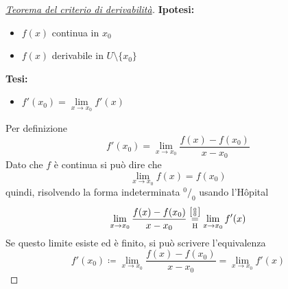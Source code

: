 \begin{proof}
  [\protect\hyperlink{teor:deriv}{Teorema del criterio di derivabilità}]
  \textbf{Ipotesi:}
  \begin{itemize}
    \item $f(x)$ continua in $x_0$
    \item $f(x)$ derivabile in $U\setminus\{x_0\}$
  \end{itemize}
  \textbf{Tesi:}
  \begin{itemize}
    \item $f'(x_0)=\lim\limits_{x\to x_0} f'(x)$
  \end{itemize}
  \divisor

  Per definizione
  \begin{equation*}
    f'(x_0) = \lim\limits_{x\to x_0} \frac{f(x)-f(x_0)}{x-x_0}
  \end{equation*}
  Dato che $f$ è continua si può dire che
  \begin{equation*}
    \lim\limits_{x\to x_0} f(x) = f(x_0)
  \end{equation*}
  quindi, risolvendo la forma indeterminata $^0\!/_0$ usando l'Hôpital
  \begin{equation*}
    \lim\limits_{x\to x_0} \frac{f(x)-f(x_0)}{x-x_0}\overset{\left[\frac{0}{0}\right]}{\underset{\mathrm{H}}{=}}\lim\limits_{x\to x_0} f'(x)
  \end{equation*}
  Se questo limite esiste ed è finito, si può scrivere l'equivalenza
  \begin{equation*}
    f'(x_0)\coloneqq\lim\limits_{x\to x_0} \frac{f(x)-f(x_0)}{x-x_0}=\lim\limits_{x\to x_0} f'(x)
  \end{equation*}
\end{proof}
